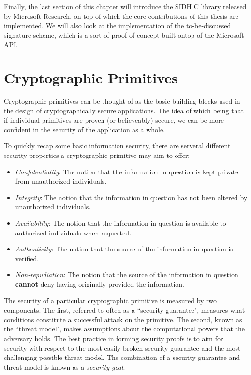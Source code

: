 Finally, the last section of this chapter will introduce the SIDH C library released by Microsoft Research, on top of which the core contributions of this thesis are implemented. We will also look at the implementation of the to-be-discussed signature scheme, which is a sort of proof-of-concept built ontop of the Microsoft API.\\


\section{Cryptographic Primitives}

Cryptographic primitives can be thought of as the basic building blocks used in the design of cryptographically secure applications. The idea of which being that if individual primitives are proven (or believeably) secure, we can be more confident in the security of the application as a whole.

To quickly recap some basic information security, there are serveral different security properties a cryptographic primitive may aim to offer:
\begin{itemize}
\item \emph{Confidentiality}:
The notion that the information in question is kept private from unauthorized individuals.
\item \emph{Integrity}:
The notion that the information in question has not been altered by unauthorized individuals.
\item \emph{Availability}:
The notion that the information in question is available to authorized individuals when requested.
\item \emph{Authenticity}:
The notion that the source of the information in question is verified.
\item \emph{Non-repudiation}:
The notion that the source of the information in question \textbf{cannot} deny having originally provided the information.
\end{itemize}

The security of a particular cryptographic primitive is measured by two components. The first, referred to often as a ``security guarantee", measures what conditions constitute a successful attack on the primitive. The second, known as the ``threat model", makes assumptions about the computational powers that the adversary holds. The best practice in forming security proofs is to aim for security with respect to the most easily broken security guarantee and the most challenging possible threat model. The combination of a security guarantee and threat model is known as a \emph{security goal}.

